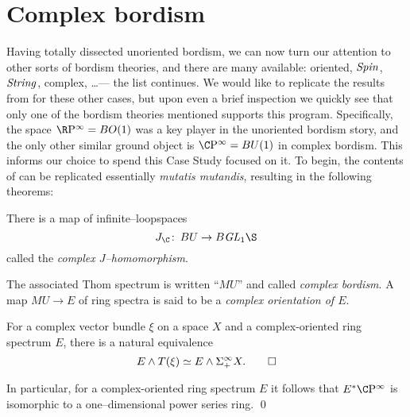 
\chapter{Complex bordism}\label{ComplexBordismChapter}


Having totally dissected unoriented bordism, we can now turn our attention to other sorts of bordism theories, and there are many available: oriented, $\mathit{Spin}$, $\mathit{String}$, complex, \ldots --- the list continues.  We would like to replicate the results from  for these other cases, but upon even a brief inspection we quickly see that only one of the bordism theories mentioned supports this program.  Specifically, the space $\RP^\infty = BO(1)$ was a key player in the unoriented bordism story, and the only other similar ground object is $\CP^\infty = BU(1)$ in complex bordism.  This informs our choice to spend this Case Study focused on it.  To begin, the contents of  can be replicated essentially \textit{mutatis mutandis}, resulting in the following theorems:

\begin{theorem}\label{ComplexJHomomorphism}
There is a map of infinite--loopspaces \[J_{\C}\co BU \to B \GL_1 \S\] called the \textit{complex $J$--homomorphism}.
\end{theorem}

\begin{definition}
The associated Thom spectrum is written ``$MU$'' and called \textit{complex bordism}.  A map $MU \to E$ of ring spectra is said to be a \textit{complex orientation of $E$}.
\end{definition}

\begin{theorem}\label{ThomIsomOverC}
For a complex vector bundle $\xi$ on a space $X$ and a complex-oriented ring spectrum $E$, there is a natural equivalence \[E \wedge T(\xi) \simeq E \wedge \Sigma^\infty_+ X. \qed\]
\end{theorem}

\begin{corollary}\label{CPinftyNiceCalculation}
In particular, for a complex-oriented ring spectrum $E$ it follows that $E^* \CP^\infty$ is isomorphic to a one--dimensional power series ring. \qed
{}
\end{corollary}

